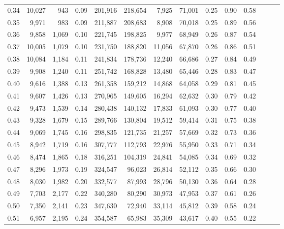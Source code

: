 \begin{tabular}{rrrrrrrrrrrrrr}
0.34 &  10,027 &    943 &  0.09 &  201,916 &  218,654 &   7,925 &  71,001 &  0.25 &  0.90 &      0.58 \\
0.35 &   9,971 &    983 &  0.09 &  211,887 &  208,683 &   8,908 &  70,018 &  0.25 &  0.89 &      0.56 \\
0.36 &   9,858 &  1,069 &  0.10 &  221,745 &  198,825 &   9,977 &  68,949 &  0.26 &  0.87 &      0.54 \\
0.37 &  10,005 &  1,079 &  0.10 &  231,750 &  188,820 &  11,056 &  67,870 &  0.26 &  0.86 &      0.51 \\
0.38 &  10,084 &  1,184 &  0.11 &  241,834 &  178,736 &  12,240 &  66,686 &  0.27 &  0.84 &      0.49 \\
0.39 &   9,908 &  1,240 &  0.11 &  251,742 &  168,828 &  13,480 &  65,446 &  0.28 &  0.83 &      0.47 \\
0.40 &   9,616 &  1,388 &  0.13 &  261,358 &  159,212 &  14,868 &  64,058 &  0.29 &  0.81 &      0.45 \\
0.41 &   9,607 &  1,426 &  0.13 &  270,965 &  149,605 &  16,294 &  62,632 &  0.30 &  0.79 &      0.42 \\
0.42 &   9,473 &  1,539 &  0.14 &  280,438 &  140,132 &  17,833 &  61,093 &  0.30 &  0.77 &      0.40 \\
0.43 &   9,328 &  1,679 &  0.15 &  289,766 &  130,804 &  19,512 &  59,414 &  0.31 &  0.75 &      0.38 \\
0.44 &   9,069 &  1,745 &  0.16 &  298,835 &  121,735 &  21,257 &  57,669 &  0.32 &  0.73 &      0.36 \\
0.45 &   8,942 &  1,719 &  0.16 &  307,777 &  112,793 &  22,976 &  55,950 &  0.33 &  0.71 &      0.34 \\
0.46 &   8,474 &  1,865 &  0.18 &  316,251 &  104,319 &  24,841 &  54,085 &  0.34 &  0.69 &      0.32 \\
0.47 &   8,296 &  1,973 &  0.19 &  324,547 &   96,023 &  26,814 &  52,112 &  0.35 &  0.66 &      0.30 \\
0.48 &   8,030 &  1,982 &  0.20 &  332,577 &   87,993 &  28,796 &  50,130 &  0.36 &  0.64 &      0.28 \\
0.49 &   7,703 &  2,177 &  0.22 &  340,280 &   80,290 &  30,973 &  47,953 &  0.37 &  0.61 &      0.26 \\
0.50 &   7,350 &  2,141 &  0.23 &  347,630 &   72,940 &  33,114 &  45,812 &  0.39 &  0.58 &      0.24 \\
0.51 &   6,957 &  2,195 &  0.24 &  354,587 &   65,983 &  35,309 &  43,617 &  0.40 &  0.55 &      0.22 \\

\end{tabular}
